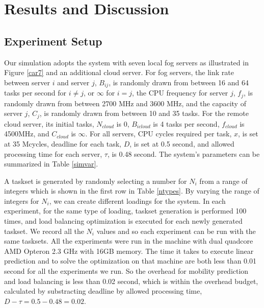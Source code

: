 \iffalse
\section{Results and Discussion}
\label{s4}

\subsection{Experiment Setup}

Our simulation adopts the system with seven local fog servers as illustrated in Figure \ref{car7} and an additional cloud server. For fog servers, the link rate between server $i$ and server $j$, $B_{ij}$, is randomly drawn from between 16 and 64 tasks per second for $i\ne j$, or $\infty$ for $i=j$, the CPU frequency for server $j$, ${f_{j}}$, is randomly drawn from between 2700 MHz and 3600 MHz, and the capacity of server $j$, $C_{j}$,  is randomly drawn from between 10 and 35 tasks. For the remote cloud server, its initial tasks, $N_{cloud}$ is 0, $B_{icloud}$ is 4 tasks per second, ${f_{cloud}}$ is 4500MHz, and $C_{cloud}$ is $\infty$. For all servers, CPU cycles required per task, $x$, is set at 35 Mcycles, deadline for each task, $D$, is set at 0.5 second, and allowed processing time for each server, $\tau$, is 0.48 second. The system's parameters can be summarized in Table \ref{simvar}.

A taskset is generated by randomly selecting a number for $N_{i}$ from a range of integers which is shown in the first row in Table \ref{ntypes}. By varying the range of integers for $N_{i}$, we can create different loadings for the system. In each experiment, for the same type of loading, taskset generation is performed 100 times, and load balancing optimization is executed for each newly generated taskset. We record all the $N_{i}$ values and so each experiment can be run with the same tasksets. All the experiments were run in the machine with dual quadcore AMD Opteron 2.3 GHz with 16GB memory. The time it takes to execute linear prediction and to solve the optimization on that machine are both less than 0.01 second for all the experiments we run. So the overhead for mobility prediction and load balancing is less than 0.02 second, which is within the overhead budget, calculated by substracting deadline by allowed processing time, $D-\tau=0.5-0.48=0.02$.


